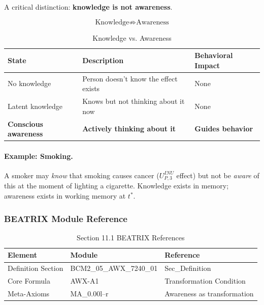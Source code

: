 A critical distinction: \textbf{knowledge is not awareness}.

\begin{equation}
\text{Knowledge} \not\Rightarrow \text{Awareness}
\end{equation}

\begin{table}[htbp]
\centering
\caption{Knowledge vs. Awareness}
\label{tab:knowledge-vs-awareness}
\renewcommand{\arraystretch}{1.3}
\begin{tabular}{@{}lll@{}}
\toprule
\textbf{State} & \textbf{Description} & \textbf{Behavioral Impact} \\
\midrule
No knowledge & Person doesn't know the effect exists & None \\
Latent knowledge & Knows but not thinking about it now & None \\
\textbf{Conscious awareness} & \textbf{Actively thinking about it} & \textbf{Guides behavior} \\
\bottomrule
\end{tabular}
\end{table}

\paragraph{Example: Smoking.}
A smoker may \emph{know} that smoking causes cancer ($U^{INU}_{P,3}$ effect)
but not be \emph{aware} of this at the moment of lighting a cigarette.
Knowledge exists in memory; awareness exists in working memory at $t^*$.

\subsubsection{BEATRIX Module Reference}

\begin{table}[htbp]
\centering
\caption{Section 11.1 BEATRIX References}
\label{tab:11-1-beatrix}
\renewcommand{\arraystretch}{1.3}
\begin{tabular}{@{}lll@{}}
\toprule
\textbf{Element} & \textbf{Module} & \textbf{Reference} \\
\midrule
Definition Section & BCM2\_05\_AWX\_7240\_01 & Sec\_Definition \\
Core Formula & AWX-A1 & Transformation Condition \\
Meta-Axioms & MA\_0.00l--r & Awareness as transformation \\
\bottomrule
\end{tabular}
\end{table}

